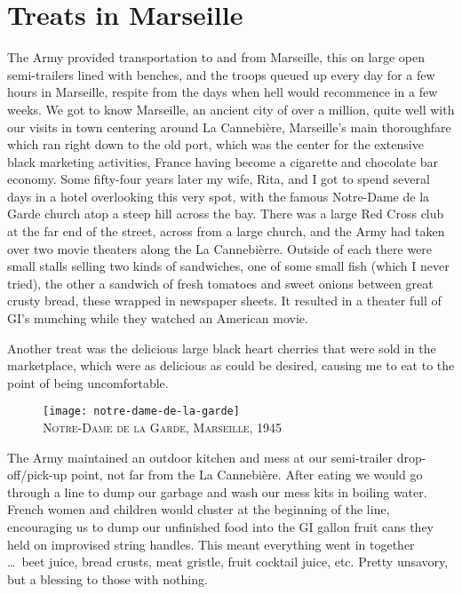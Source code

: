 \documentclass[../m3y]{subfiles}
\begin{document}
\section{Treats in Marseille}
The Army provided transportation to and from Marseille, this on large open semi-trailers lined with benches, and the troops queued up every day for a few hours in Marseille, respite from the days when hell would recommence in a few weeks. We got to know Marseille, an ancient city of over a million, quite well with our visits in town centering around La Cannebi\`ere, Marseille's main thoroughfare which ran right down to the old port, which was the center for the extensive black marketing activities, France having become a cigarette and chocolate bar economy. Some fifty-four years later my wife, Rita, and I got to spend several days in a hotel overlooking this very spot, with the famous Notre-Dame de la Garde church atop a steep hill across the bay. There was a large Red Cross club at the far end of the street, across from a large church, and the Army had taken over two movie theaters along the La Cannebi\`erre. Outside of each there were small stalls selling two kinds of sandwiches, one of some small fish (which I never tried), the other a sandwich of fresh tomatoes and sweet onions between great crusty bread, these wrapped in newspaper sheets. It resulted in a theater full of GI's munching while they watched an American movie.

Another treat was the delicious large black heart cherries that were sold in the marketplace, which were as delicious as could be desired, causing me to eat to the point of being uncomfortable.

\begin{figure}[h]
\centering
\texttt{[image: notre-dame-de-la-garde]}\\
\medskip
{\newtimes\textsc{Notre-Dame de la Garde, Marseille, 1945}}
\end{figure}

The Army maintained an outdoor kitchen and mess at our semi-trailer drop-off/pick-up point, not far from the La Cannebi\`ere. After eating we would go through a line to dump our garbage and wash our mess kits in boiling water. French women and children would cluster at the beginning of the line, encouraging us to dump our unfinished food into the GI gallon fruit cans they held on improvised string handles. This meant everything went in together \ldots\ beet juice, bread crusts, meat gristle, fruit cocktail juice, etc\@. Pretty unsavory, but a blessing to those with nothing.
\end{document}

